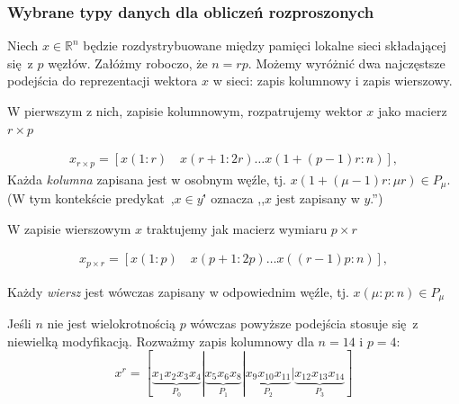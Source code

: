 \subsubsection{Wybrane typy danych dla obliczeń rozproszonych}

Niech \(x\in\mathbb{R}^n\) będzie rozdystrybuowane między pamięci lokalne sieci składającej się z \(p\) węzłów. Załóżmy roboczo, że \(n=rp\). Możemy wyróżnić dwa najczęstsze podejścia do reprezentacji wektora \(x\) w sieci: zapis kolumnowy i zapis wierszowy.

W pierwszym z nich, zapisie kolumnowym, rozpatrujemy wektor \(x\) jako macierz \(r\times p\)

\begin{align*}
x_{r\times p} = \left[x(1:r)\quad x(r+1:2r) \dots x(1+(p-1)r:n)\right],
\end{align*}
Każda \emph{kolumna} zapisana jest w osobnym węźle, tj. \( x (1+(\mu-1)r\colon \mu r) \in P_{\mu}\). (W tym kontekście predykat \,,\(x\in y\)\'' oznacza ,,\(x\) jest zapisany w \(y\).'')


W zapisie wierszowym \(x\) traktujemy jak macierz wymiaru \(p\times r\)

\begin{align*}
x_{p\times r} = \left[x(1:p)\quad x(p+1:2p) \dots x((r-1)p:n)\right],
\end{align*}

Każdy \emph{wiersz} jest wówczas zapisany w odpowiednim węźle, tj. \(x (\mu \colon p \colon n)\in P_{\mu}\)

Jeśli \(n\) nie jest wielokrotnością \(p\) wówczas powyższe podejścia stosuje się z niewielką modyfikacją. Rozważmy zapis kolumnowy dla \(n=14\) i \(p=4\):
\begin{equation}
x^r=[\underbrace{x_1 x_2 x_3 x_4}_{P_0} | \underbrace{x_5 x_6 x_8}_{P_1} | \underbrace{x_9 x_{10} x_{11}}_{P_2} | \underbrace{x_{12} x_{13} x_{14}}_{P_3}]
\end{equation} 







